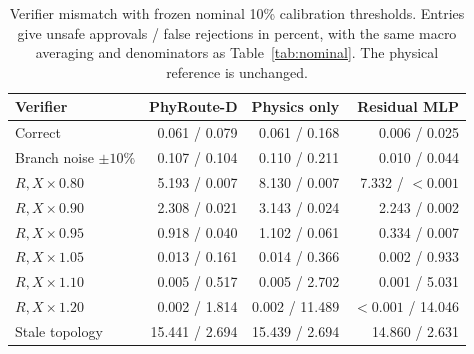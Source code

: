 \begin{table}[tb]
\caption{Verifier mismatch with frozen nominal 10\% calibration thresholds. Entries give unsafe approvals / false rejections in percent, with the same macro averaging and denominators as Table~\ref{tab:nominal}. The physical reference is unchanged.}
\label{tab:mismatch}
\centering\small
\begin{tabular}{lrrr}
\toprule
Verifier & PhyRoute-D & Physics only & Residual MLP \\
\midrule
Correct & 0.061 / 0.079 & 0.061 / 0.168 & 0.006 / 0.025 \\
Branch noise $\pm10\%$ & 0.107 / 0.104 & 0.110 / 0.211 & 0.010 / 0.044 \\
$R,X\times0.80$ & 5.193 / 0.007 & 8.130 / 0.007 & 7.332 / $< 0.001$ \\
$R,X\times0.90$ & 2.308 / 0.021 & 3.143 / 0.024 & 2.243 / 0.002 \\
$R,X\times0.95$ & 0.918 / 0.040 & 1.102 / 0.061 & 0.334 / 0.007 \\
$R,X\times1.05$ & 0.013 / 0.161 & 0.014 / 0.366 & 0.002 / 0.933 \\
$R,X\times1.10$ & 0.005 / 0.517 & 0.005 / 2.702 & 0.001 / 5.031 \\
$R,X\times1.20$ & 0.002 / 1.814 & 0.002 / 11.489 & $< 0.001$ / 14.046 \\
Stale topology & 15.441 / 2.694 & 15.439 / 2.694 & 14.860 / 2.631 \\
\bottomrule
\end{tabular}
\end{table}
